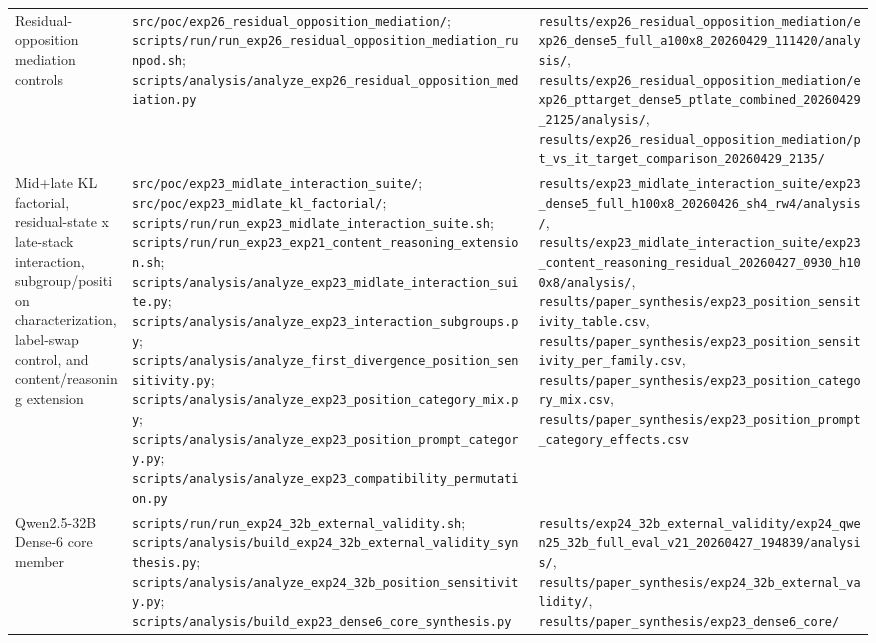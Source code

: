 \documentclass[11pt]{article}
\begin{document}
\begin{table}[t]
\begin{tabularx}{\linewidth}{@{}>{\raggedright\arraybackslash}X >{\raggedright\arraybackslash}X >{\raggedright\arraybackslash}X@{}}
Residual-opposition mediation controls & \texttt{src/poc/exp26\_residual\_opposition\_mediation/}; \texttt{scripts/run/run\_exp26\_residual\_opposition\_mediation\_runpod.sh}; \texttt{scripts/analysis/analyze\_exp26\_residual\_opposition\_mediation.py} & \texttt{results/exp26\_residual\_opposition\_mediation/exp26\_dense5\_full\_a100x8\_20260429\_111420/analysis/}, \texttt{results/exp26\_residual\_opposition\_mediation/exp26\_pttarget\_dense5\_ptlate\_combined\_20260429\_2125/analysis/}, \texttt{results/exp26\_residual\_opposition\_mediation/pt\_vs\_it\_target\_comparison\_20260429\_2135/} \\
Mid+late KL factorial, residual-state x late-stack interaction, subgroup/position characterization, label-swap control, and content/reasoning extension & \texttt{src/poc/exp23\_midlate\_interaction\_suite/}; \texttt{src/poc/exp23\_midlate\_kl\_factorial/}; \texttt{scripts/run/run\_exp23\_midlate\_interaction\_suite.sh}; \texttt{scripts/run/run\_exp23\_exp21\_content\_reasoning\_extension.sh}; \texttt{scripts/analysis/analyze\_exp23\_midlate\_interaction\_suite.py}; \texttt{scripts/analysis/analyze\_exp23\_interaction\_subgroups.py}; \texttt{scripts/analysis/analyze\_first\_divergence\_position\_sensitivity.py}; \texttt{scripts/analysis/analyze\_exp23\_position\_category\_mix.py}; \texttt{scripts/analysis/analyze\_exp23\_position\_prompt\_category.py}; \texttt{scripts/analysis/analyze\_exp23\_compatibility\_permutation.py} & \texttt{results/exp23\_midlate\_interaction\_suite/exp23\_dense5\_full\_h100x8\_20260426\_sh4\_rw4/analysis/}, \texttt{results/exp23\_midlate\_interaction\_suite/exp23\_content\_reasoning\_residual\_20260427\_0930\_h100x8/analysis/}, \texttt{results/paper\_synthesis/exp23\_position\_sensitivity\_table.csv}, \texttt{results/paper\_synthesis/exp23\_position\_sensitivity\_per\_family.csv}, \texttt{results/paper\_synthesis/exp23\_position\_category\_mix.csv}, \texttt{results/paper\_synthesis/exp23\_position\_prompt\_category\_effects.csv} \\
Qwen2.5-32B Dense-6 core member & \texttt{scripts/run/run\_exp24\_32b\_external\_validity.sh}; \texttt{scripts/analysis/build\_exp24\_32b\_external\_validity\_synthesis.py}; \texttt{scripts/analysis/analyze\_exp24\_32b\_position\_sensitivity.py}; \texttt{scripts/analysis/build\_exp23\_dense6\_core\_synthesis.py} & \texttt{results/exp24\_32b\_external\_validity/exp24\_qwen25\_32b\_full\_eval\_v21\_20260427\_194839/analysis/}, \texttt{results/paper\_synthesis/exp24\_32b\_external\_validity/}, \texttt{results/paper\_synthesis/exp23\_dense6\_core/} \\

\end{tabularx}
\end{table}
\end{document}
